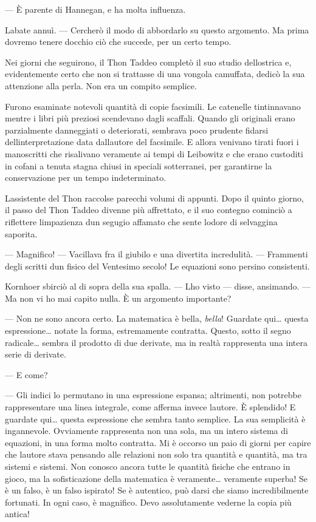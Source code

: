 --- È parente di Hannegan, e ha molta influenza.

L\textquotesingle abate annuì. --- Cercherò il modo di abbordarlo su
questo argomento. Ma prima dovremo tenere d\textquotesingle occhio ciò
che succede, per un certo tempo.

Nei giorni che seguirono, il Thon Taddeo completò il suo studio
dell\textquotesingle ostrica e, evidentemente certo che non si trattasse
di una vongola camuffata, dedicò la sua attenzione alla perla. Non era
un compito semplice.

Furono esaminate notevoli quantità di copie facsimili. Le catenelle
tintinnavano mentre i libri più preziosi scendevano dagli scaffali.
Quando gli originali erano parzialmente danneggiati o deteriorati,
sembrava poco prudente fidarsi dell\textquotesingle interpretazione data
dall\textquotesingle autore del facsimile. E allora venivano tirati
fuori i manoscritti che risalivano veramente ai tempi di Leibowitz e che
erano custoditi in cofani a tenuta stagna chiusi in speciali
sotterranei, per garantirne la conservazione per un tempo indeterminato.

L\textquotesingle assistente del Thon raccolse parecchi volumi di
appunti. Dopo il quinto giorno, il passo del Thon Taddeo divenne più
affrettato, e il suo contegno cominciò a riflettere
l\textquotesingle impazienza d\textquotesingle un segugio affamato che
sente l\textquotesingle odore di selvaggina saporita.

--- Magnifico! --- Vacillava fra il giubilo e una divertita incredulità.
--- Frammenti degli scritti d\textquotesingle un fisico del Ventesimo
secolo! Le equazioni sono persino consistenti.

Kornhoer sbirciò al di sopra della sua spalla. --- L\textquotesingle ho
visto --- disse, ansimando. --- Ma non vi ho mai capito nulla. È un
argomento importante?

--- Non ne sono ancora certo. La matematica è bella, \emph{bella}!
Guardate qui\ldots{} questa espressione\ldots{} notate la forma,
estremamente contratta. Questo, sotto il segno radicale\ldots{} sembra
il prodotto di due derivate, ma in realtà rappresenta una intera serie
di derivate.

--- E come?

--- Gli indici lo permutano in una espressione espansa; altrimenti, non
potrebbe rappresentare una linea integrale, come afferma invece
l\textquotesingle autore. È splendido! E guardate qui\ldots{} questa
espressione che sembra tanto semplice. La sua semplicità è ingannevole.
Ovviamente rappresenta non una sola, ma un intero sistema di equazioni,
in una forma molto contratta. Mi è occorso un paio di giorni per capire
che l\textquotesingle autore stava pensando alle relazioni non solo tra
quantità e quantità, ma tra sistemi e sistemi. Non conosco ancora tutte
le quantità fisiche che entrano in gioco, ma la sofisticazione della
matematica è veramente\ldots{} veramente superba! Se è un falso, è un
falso ispirato! Se è autentico, può darsi che siamo incredibilmente
fortunati. In ogni caso, è magnifico. Devo assolutamente vederne la
copia più antica!

